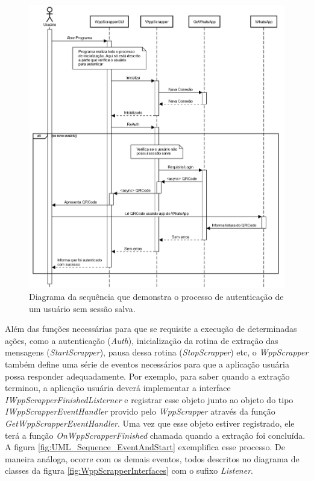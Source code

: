 \begin{figure}[!htb]
    \includegraphics[width=\textwidth]{img/UML_Sequence_Auth.png}
    \caption{Diagrama da sequência que demonstra o processo de autenticação de um usuário sem sessão salva.}
    \centering
    \label{fig:UML_Sequence_Auth}
\end{figure}

Além das funções necessárias para que se requisite a execução de determinadas ações, como a autenticação (\textit{Auth}), inicialização da rotina de extração das mensagens (\textit{StartScrapper}), pausa dessa rotina (\textit{StopScrapper}) etc, o \textit{WppScrapper} também define uma série de eventos necessários para que a aplicação usuária possa responder adequadamente. Por exemplo, para saber quando a extração terminou, a aplicação usuária deverá implementar a interface \textit{IWppScrapperFinishedListerner} e registrar esse objeto junto ao objeto do tipo \textit{IWppScrapperEventHandler} provido pelo \textit{WppScrapper} através da função \textit{GetWppScrapperEventHandler}. Uma vez que esse objeto estiver registrado, ele terá a função \textit{OnWppScrapperFinished} chamada quando a extração foi concluída. A figura \ref{fig:UML_Sequence_EventAndStart} exemplifica esse processo. De maneira análoga, ocorre com os demais eventos, todos descritos no diagrama de classes da figura \ref{fig:WppScrapperInterfaces} com o sufixo \textit{Listener}.

